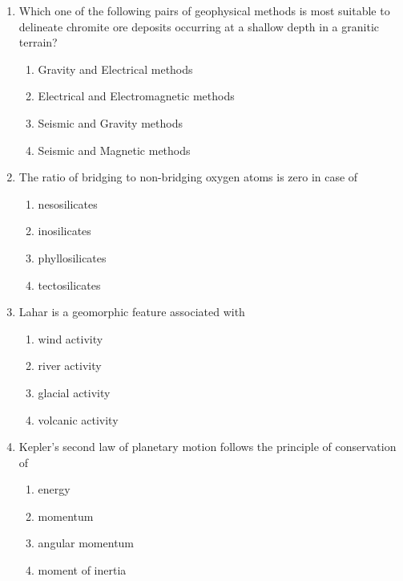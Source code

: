 \documentclass[journal,12pt,onecolumn]{IEEEtran}
\begin{document}
\begin{enumerate}
\item Which one of the following pairs of geophysical methods is most suitable to delineate chromite ore deposits occurring at a shallow depth in a granitic terrain?

\hfill{}
\begin{multicols}{2}
\begin{enumerate}
    \item Gravity and Electrical methods
    \item Electrical and Electromagnetic methods
    \item Seismic and Gravity methods
    \item Seismic and Magnetic methods
\end{enumerate}
\end{multicols}

\item The ratio of bridging to non-bridging oxygen atoms is zero in case of

\hfill{}
\begin{multicols}{2}
\begin{enumerate}
    \item nesosilicates
    \item inosilicates
    \item phyllosilicates
    \item tectosilicates
\end{enumerate}
\end{multicols}

\item Lahar is a geomorphic feature associated with

\hfill{}
\begin{multicols}{2}
\begin{enumerate}
    \item wind activity
    \item river activity
    \item glacial activity
    \item volcanic activity
\end{enumerate}
\end{multicols}

\item Kepler's second law of planetary motion follows the principle of conservation of

\hfill{}
\begin{multicols}{2}
\begin{enumerate}
    \item energy
    \item momentum
    \item angular momentum
    \item moment of inertia
\end{enumerate}
\end{multicols}


\end{enumerate}
\end{document}

